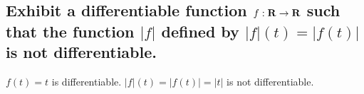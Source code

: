 \begin{parts}
    \part{
        Exhibit a differentiable function
        $f:\mathbf{R}\to\mathbf{R}$ such that the 
        function $\vert f\vert$ defined
        by $\vert f\vert(t)=\vert f(t)
        \vert$ is not differentiable.
    }
    \begin{solution}
        $f(t)=t$ is differentiable.
        $\vert f\vert(t)=
        \vert f(t)\vert=
        \vert t\vert$ is
        not differentiable.
    \end{solution}
\end{parts}